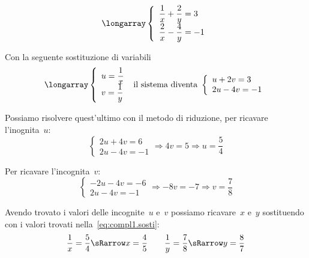  \begin{esempio}
\[\longarray\left\{\begin{array}{l}
  \dfrac{1}{x}+\dfrac{2}{y}=3\\
  \dfrac{2}{x}-\dfrac{4}{y}=-1 
\end{array}\right.\]

 
Con la seguente sostituzione di variabili
\label{eq:compl1.sosti}
\[\longarray\left\{\begin{array}{l}
  u=\dfrac{1}{x}\\
  v=\dfrac{1}{y}
\end{array}\right.
 \text{ il sistema diventa }
\left\{\begin{array}{l}
  u+2v=3 \\
  2u-4v=-1 
\end{array}\right.\]


Possiamo risolvere quest'ultimo con il metodo di riduzione, 
per ricavare l'inognita~$u$:
\[\left\{\begin{array}{l}
2u+4v=6 \\
2u-4v=-1
\end{array}\right. \Rightarrow 4v=5 \Rightarrow u=\frac{5}{4}\]

Per ricavare l'incognita~$v$:
\[\left\{\begin{array}{l}
-2u-4v=-6 \\
2u-4v=-1 \end{array}\right. \Rightarrow -8v=-7 \Rightarrow v=\frac{7}{8}\]

Avendo trovato i valori delle incognite~$u$ e~$v$ possiamo ricavare~$x$ 
e~$y$ sostituendo con i valori trovati nella~\ref{eq:compl1.sosti}:
\[\dfrac{1}{x}=\dfrac{5}{4} \sRarrow x=\dfrac{4}{5} \qquad
  \dfrac{1}{y}=\dfrac{7}{8} \sRarrow y=\dfrac{8}{7}\]
 \end{esempio}

